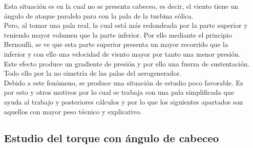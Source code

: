 Esta situación es en la cual no se presenta cabeceo, es decir, el viento tiene un ángulo de ataque paralelo para con la pala de la turbina eólica. \\

Pero, al tomar una pala real, la cual está más redondeada por la parte superior y teniendo mayor volumen que la parte inferior. Por ello mediante el principio Bernoulli, se ve que esta parte superior presenta un mayor recorrido que la inferior y con ello una velocidad de viento mayor por tanto una menor presión. \\

Este efecto produce un gradiente de presión y por ello una fuerza de sustentación. Todo ello por la no simetría de las palas del aerogenerador. \\

Debido a este fenómeno, se produce una situación de estudio poco favorable. Es por esto y otros motivos por lo cual se trabaja con una pala simplificada que ayuda al trabajo y posteriores cálculos y por lo que los siguientes apartados son aquellos con mayor peso técnico y explicativo. \\






















\subsection{Estudio del torque con ángulo de cabeceo}
\label{section:torque_giro_inicial}

